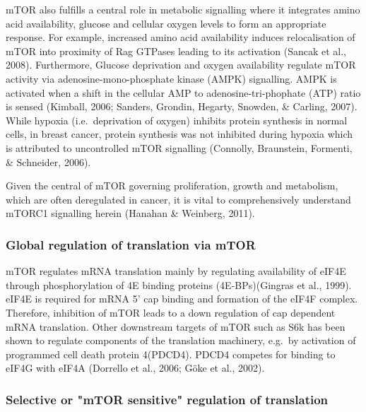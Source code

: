 \documentclass[
  12pt,
  openany]{book}
\begin{document}
mTOR also fulfills a central role in metabolic signalling where it integrates amino acid availability, glucose and cellular oxygen levels to form an appropriate response. For example, increased amino acid availability induces relocalisation of mTOR into proximity of Rag GTPases leading to its activation (Sancak et al., 2008). Furthermore, Glucose deprivation and oxygen availability regulate mTOR activity via adenosine-mono-phosphate kinase (AMPK) signalling. AMPK is activated when a shift in the cellular AMP to adenosine-tri-phophate (ATP) ratio is sensed (Kimball, 2006; Sanders, Grondin, Hegarty, Snowden, \& Carling, 2007). While hypoxia (i.e.~deprivation of oxygen) inhibits protein synthesis in normal cells, in breast cancer, protein synthesis was not inhibited during hypoxia which is attributed to uncontrolled mTOR signalling (Connolly, Braunstein, Formenti, \& Schneider, 2006).

Given the central of mTOR governing proliferation, growth and metabolism, which are often deregulated in cancer, it is vital to comprehensively understand mTORC1 signalling herein (Hanahan \& Weinberg, 2011).

\subsubsection{Global regulation of translation via mTOR}

mTOR regulates mRNA translation mainly by regulating availability of eIF4E through phosphorylation of 4E binding proteins (4E-BPs)(Gingras et al., 1999). eIF4E is required for mRNA 5' cap binding and formation of the eIF4F complex. Therefore, inhibition of mTOR leads to a down regulation of cap dependent mRNA translation.
Other downstream targets of mTOR such as S6k has been shown to regulate components of the translation machinery, e.g.~by activation of programmed cell death protein 4(PDCD4). PDCD4 competes for binding to eIF4G with eIF4A (Dorrello et al., 2006; Göke et al., 2002).

\subsubsection{Selective or "mTOR sensitive" regulation of translation}
\end{document}
